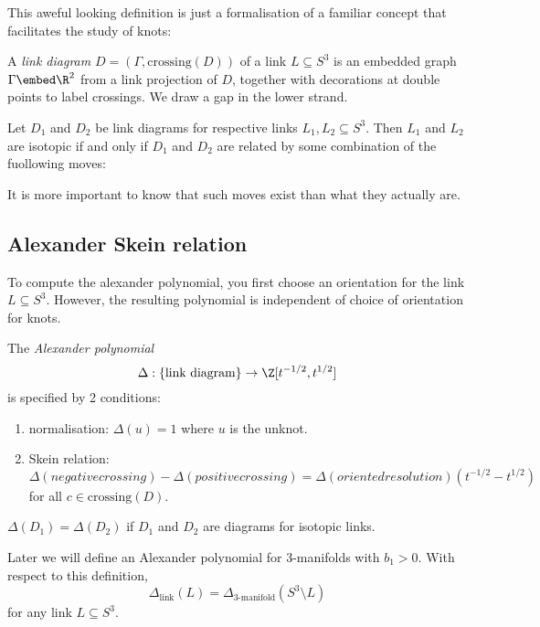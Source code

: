 \documentclass[a4paper]{article}
\begin{document}
This aweful looking definition is just a formalisation of a familiar concept that facilitates the study of knots:

\begin{definition}
  A \emph{link diagram} \(D = (\Gamma, \text{crossing} (D))\) of a link \(L \subseteq S^3\) is an embedded graph \(\Gamma \embed \R^2\) from a link projection of \(D\), together with decorations at double points to label crossings. We draw a gap in the lower strand.
\end{definition}

\begin{theorem}
  Let \(D_1\) and \(D_2\) be link diagrams for respective links \(L_1, L_2 \subseteq S^3\). Then \(L_1\) and \(L_2\) are isotopic if and only if \(D_1\) and \(D_2\) are related by some combination of the fuollowing moves:
\end{theorem}

It is more important to know that such moves exist than what they actually are.

\subsection{Alexander Skein relation}

To compute the alexander polynomial, you first choose an orientation for the link \(L \subseteq S^3\). However, the resulting polynomial is independent of choice of orientation for knots.

\begin{theorem}[Alexander]
  The \emph{Alexander polynomial}
  \[
    \Delta: \{\text{link diagram}\} \to \Z[t^{-1/2}, t^{1/2}]
  \]
  is specified by 2 conditions:
  \begin{enumerate}
  \item normalisation: \(\Delta(u) = 1\) where \(u\) is the unknot.
  \item Skein relation: \(\Delta(negative crossing) - \Delta(positive crossing) = \Delta(oriented resolution) (t^{-1/2} - t^{1/2})\) for all \(c \in \text{crossing}(D)\).
  \end{enumerate}
  \(\Delta(D_1) = \Delta(D_2)\) if \(D_1\) and \(D_2\) are diagrams for isotopic links.
\end{theorem}

\begin{theorem}
  Later we will define an Alexander polynomial for 3-manifolds with \(b_1 > 0\). With respect to this definition,
  \[
    \Delta_{\text{link}}(L) = \Delta_{\text{3-manifold}}(S^3 \setminus L)
  \]
  for any link \(L \subseteq S^3\).
\end{theorem}
\end{document}
